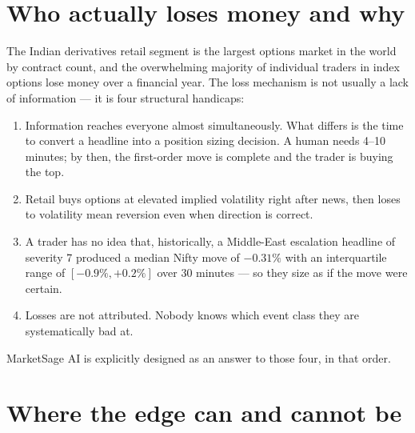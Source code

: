 \section{Who actually loses money and why}

The Indian derivatives retail segment is the largest options market in the world
by contract count, and the overwhelming majority of individual traders in index
options lose money over a financial year. The loss mechanism is not usually a
lack of information --- it is four structural handicaps:

\begin{enumerate}
\item {} Information reaches everyone almost
simultaneously. What differs is the time to convert a headline into a position
sizing decision. A human needs 4--10 minutes; by then, the first-order move is
complete and the trader is buying the top.
\item {} Retail buys options at elevated implied
volatility right after news, then loses to volatility mean reversion even when
direction is correct.
\item {} A trader has no idea that, historically,
a Middle-East escalation headline of severity 7 produced a median Nifty move of
$-0.31\%$ with an interquartile range of $[-0.9\%, +0.2\%]$ over 30 minutes ---
so they size as if the move were certain.
\item {} Losses are not attributed. Nobody knows which
event class they are systematically bad at.
\end{enumerate}

MarketSage AI is explicitly designed as an answer to those four, in that order.

\section{Where the edge can and cannot be}


